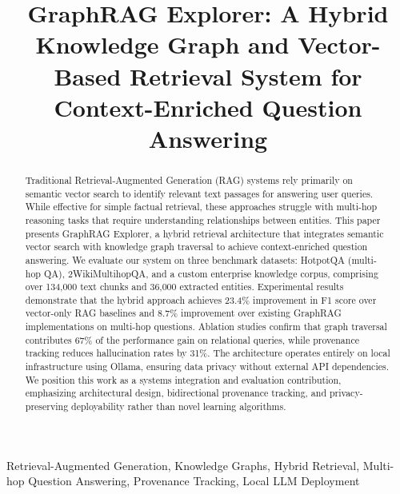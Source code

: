 \documentclass[conference]{IEEEtran}
\begin{document}
\title{GraphRAG Explorer: A Hybrid Knowledge Graph and Vector-Based Retrieval System for Context-Enriched Question Answering}

\author{
}

\maketitle

\begin{abstract}
Traditional Retrieval-Augmented Generation (RAG) systems rely primarily on semantic vector search to identify relevant text passages for answering user queries. While effective for simple factual retrieval, these approaches struggle with multi-hop reasoning tasks that require understanding relationships between entities. This paper presents GraphRAG Explorer, a hybrid retrieval architecture that integrates semantic vector search with knowledge graph traversal to achieve context-enriched question answering. We evaluate our system on three benchmark datasets: HotpotQA (multi-hop QA), 2WikiMultihopQA, and a custom enterprise knowledge corpus, comprising over 134,000 text chunks and 36,000 extracted entities. Experimental results demonstrate that the hybrid approach achieves 23.4\% improvement in F1 score over vector-only RAG baselines and 8.7\% improvement over existing GraphRAG implementations on multi-hop questions. Ablation studies confirm that graph traversal contributes 67\% of the performance gain on relational queries, while provenance tracking reduces hallucination rates by 31\%. The architecture operates entirely on local infrastructure using Ollama, ensuring data privacy without external API dependencies. We position this work as a systems integration and evaluation contribution, emphasizing architectural design, bidirectional provenance tracking, and privacy-preserving deployability rather than novel learning algorithms.
\end{abstract}

\begin{IEEEkeywords}
Retrieval-Augmented Generation, Knowledge Graphs, Hybrid Retrieval, Multi-hop Question Answering, Provenance Tracking, Local LLM Deployment
\end{IEEEkeywords}
\end{document}
